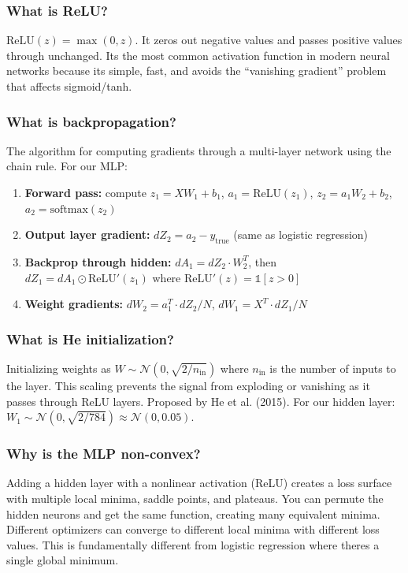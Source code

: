 \documentclass[11pt, letterpaper]{article}
\begin{document}
\begin{deepdive}
\subsubsection{What is ReLU?}
$\text{ReLU}(z) = \max(0, z)$. It zeros out negative values and passes positive values through unchanged. Its the most common activation function in modern neural networks because its simple, fast, and avoids the ``vanishing gradient'' problem that affects sigmoid/tanh.

\subsubsection{What is backpropagation?}
The algorithm for computing gradients through a multi-layer network using the chain rule. For our MLP:
\begin{enumerate}[leftmargin=2em, itemsep=2pt]
  \item \textbf{Forward pass:} compute $z_1 = XW_1 + b_1$, $a_1 = \text{ReLU}(z_1)$, $z_2 = a_1 W_2 + b_2$, $a_2 = \text{softmax}(z_2)$
  \item \textbf{Output layer gradient:} $dZ_2 = a_2 - y_{\text{true}}$ (same as logistic regression)
  \item \textbf{Backprop through hidden:} $dA_1 = dZ_2 \cdot W_2^T$, then $dZ_1 = dA_1 \odot \text{ReLU}'(z_1)$ where $\text{ReLU}'(z) = \mathbb{1}[z > 0]$
  \item \textbf{Weight gradients:} $dW_2 = a_1^T \cdot dZ_2 / N$, $dW_1 = X^T \cdot dZ_1 / N$
\end{enumerate}

\subsubsection{What is He initialization?}
Initializing weights as $W \sim \mathcal{N}(0, \sqrt{2/n_{\text{in}}})$ where $n_{\text{in}}$ is the number of inputs to the layer. This scaling prevents the signal from exploding or vanishing as it passes through ReLU layers. Proposed by He et al. (2015). For our hidden layer: $W_1 \sim \mathcal{N}(0, \sqrt{2/784}) \approx \mathcal{N}(0, 0.05)$.

\subsubsection{Why is the MLP non-convex?}
Adding a hidden layer with a nonlinear activation (ReLU) creates a loss surface with multiple local minima, saddle points, and plateaus. You can permute the hidden neurons and get the same function, creating many equivalent minima. Different optimizers can converge to different local minima with different loss values. This is fundamentally different from logistic regression where theres a single global minimum.


\end{deepdive}
\end{document}
